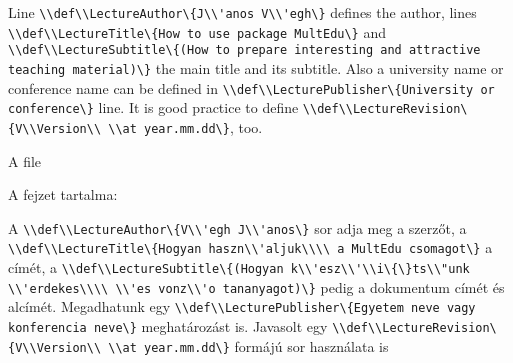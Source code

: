 {
Line \lstinline|\\def\\LectureAuthor\{J\\'anos V\\'egh\}| defines the author,
lines \lstinline|\\def\\LectureTitle\{How to use package MultEdu\}|
and \lstinline|\\def\\LectureSubtitle\{(How to prepare interesting and attractive teaching material)\}| the main title and its subtitle.
Also a university name or conference name can be defined in \lstinline|\\def\\LecturePublisher\{University or conference\}| line.
It is good practice to define \lstinline|\\def\\LectureRevision\{V\\Version\\ \\at year.mm.dd\}|, too.

}
{A  file}
{
A fejzet tartalma:

A \lstinline|\\def\\LectureAuthor\{V\\'egh J\\'anos\}| sor adja meg a szerzőt,
a \lstinline|\\def\\LectureTitle\{Hogyan haszn\\'aljuk\\\\ a MultEdu csomagot\}|
a címét, a \lstinline|\\def\\LectureSubtitle\{(Hogyan k\\'esz\\'\\i\{\}ts\\"unk \\'erdekes\\\\ \\'es vonz\\'o tananyagot)\}| pedig a dokumentum címét és alcímét.
Megadhatunk egy \lstinline|\\def\\LecturePublisher\{Egyetem neve vagy konferencia neve\}| meghatározást is.
Javasolt egy \lstinline|\\def\\LectureRevision\{V\\Version\\ \\at year.mm.dd\}| formájú sor használata is

}

